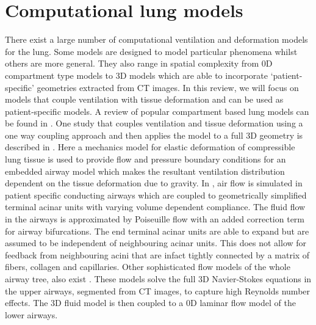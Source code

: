 \section{Computational lung models}
\label{section:review_models}
%
There exist a large number of computational ventilation and deformation models for the lung. Some models are designed to model particular phenomena whilst others are more general. They also range in spatial complexity from 0D compartment type models to 3D models which are able to incorporate `patient-specific' geometries extracted from CT images. In this review, we will focus on models that couple ventilation with tissue deformation and can be used as patient-specific models. A review of popular compartment based lung models can be found in \citet{bates2009lung}. 
%
One study that couples ventilation and tissue deformation using a one way coupling approach and then applies the model to a full 3D geometry is described in \citet{tawhai2010image}. Here a mechanics model for elastic deformation of compressible lung tissue is used to provide flow and pressure boundary conditions for an embedded airway model which makes the resultant ventilation distribution dependent on the tissue deformation due to gravity. In \citet{Swan2012}, air flow is simulated in patient specific conducting airways which are coupled to geometrically simplified terminal acinar units with varying volume dependent compliance. The fluid flow in the airways is approximated by Poiseuille flow with an added correction term for airway bifurcations. The end terminal acinar units are able to expand but are assumed to be independent of neighbouring acinar units. This does not allow for feedback from neighbouring acini that are infact tightly connected by a matrix of fibers, collagen and capillaries. 
Other sophisticated flow models of the whole airway tree, also exist \citep{yin2013multiscale,ismail2013coupled}. These models solve the full 3D Navier-Stokes equations in the upper airways, segmented from CT images, to capture high Reynolds number effects. The 3D fluid model is then coupled to a 0D laminar flow model of the lower airways. %


